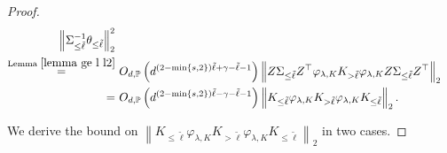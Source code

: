 \documentclass{article}
\theoremstyle{plain}
\theoremstyle{definition}
\theoremstyle{remark}
\begin{document}
\begin{appendix}
\begin{proof}
\begin{equation*}
\begin{aligned}
        \left\| \Sigma_{\leq \tilde{\ell}}^{-1} \theta_{\leq \tilde{\ell}}  \right\|_{2}^{2}\\
        \overset{\text{Lemma } \ref{lemma ge l l2}}{=}&~ 
         O_{d, \mathbb{P}} \left(  d^{(2-\min\{s, 2\})\tilde{\ell} +\gamma - \tilde{\ell}-1 } \right)\left\| Z\Sigma_{\leq \tilde{\ell}} Z^{\top} \varphi_{\lambda, K} K_{> \tilde{\ell}}  \varphi_{\lambda, K} Z \Sigma_{\leq \tilde{\ell}} Z^{\top}\right\|_{2}\\
         {=}&~ 
         O_{d, \mathbb{P}} \left(  d^{(2-\min\{s, 2\})\tilde{\ell} -\gamma - \tilde{\ell}-1 } \right)\left\| K_{\leq \tilde{\ell}} \varphi_{\lambda, K} K_{> \tilde{\ell}}  \varphi_{\lambda, K} K_{\leq \tilde{\ell}}\right\|_{2}.
    \end{aligned}
\end{equation*}


We derive the bound on $\left\| K_{\leq \tilde{\ell}} \varphi_{\lambda, K} K_{> \tilde{\ell}}  \varphi_{\lambda, K} K_{\leq \tilde{\ell}}\right\|_{2}$ in two cases. 

\newpage


\end{proof}
\end{appendix}
\end{document}
